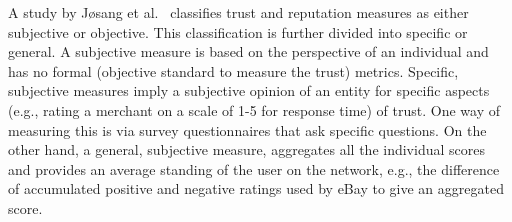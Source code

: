 A study by Jøsang et al.~\cite{ josang2007survey} classifies trust and
reputation measures as either subjective or objective. This classification is
further divided into specific or general. A subjective measure is based on the
perspective of an individual and has no formal (objective standard to measure
the trust) metrics. Specific, subjective measures imply a subjective opinion of
an entity for specific aspects (e.g., rating a merchant on a scale of 1-5 for
response time) of trust. One way of measuring this is via survey questionnaires
that ask specific questions. On the other hand, a general, subjective measure,
aggregates all the individual scores and provides an average standing of the
user on the network, e.g., the difference of accumulated positive and negative
ratings used by eBay to give an aggregated score.  \par

